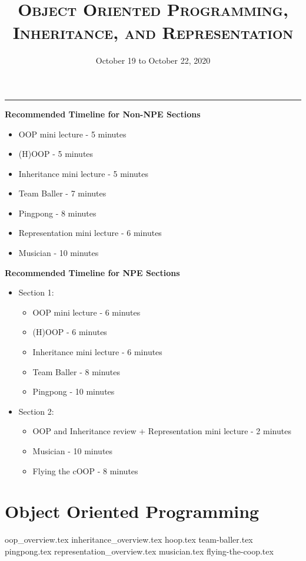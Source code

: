 \documentclass{exam}
\title{\textsc{Object Oriented Programming, Inheritance, and Representation}}
\date{October 19 to October 22, 2020}
\begin{document}
\maketitle
\rule{\textwidth}{0.15em}
\fontsize{12}{15}\selectfont

\begin{guide}
\textbf{Recommended Timeline for Non-NPE Sections}
\begin{itemize}
	\item OOP mini lecture - 5 minutes
	\item (H)OOP - 5 minutes
	\item Inheritance mini lecture - 5 minutes
	\item Team Baller - 7 minutes
	\item Pingpong - 8 minutes
	\item Representation mini lecture - 6 minutes
	\item Musician - 10 minutes
\end{itemize}
\vspace{.5cm}
\textbf{Recommended Timeline for NPE Sections}
\begin{itemize}
	\item Section 1:
	\begin{itemize}
	\item OOP mini lecture - 6 minutes
	\item (H)OOP - 6 minutes
	\item Inheritance mini lecture - 6 minutes
	\item Team Baller - 8 minutes
	\item Pingpong - 10 minutes
	\end{itemize}
	\item Section 2:
	\begin{itemize}
	\item OOP and Inheritance review + Representation mini lecture - 2 minutes
	\item Musician - 10 minutes
	\item Flying the cOOP - 8 minutes
	\end{itemize}
\end{itemize}
\end{guide}
\section{Object Oriented Programming}
\begin{questions}
{oop_overview.tex}
\linebreak
{inheritance_overview.tex}
{hoop.tex}
\newpage
{team-baller.tex}
{pingpong.tex}
\newpage
{representation_overview.tex}
{musician.tex}
{flying-the-coop.tex}
\end{questions}
\end{document}
